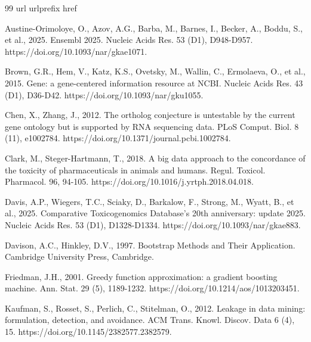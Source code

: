 \documentclass[review,12pt,authoryear]{elsarticle}
\begin{document}
\begin{thebibliography}{99}
\expandafter\ifx\csname url\endcsname\relax
  \def\url#1{\texttt{#1}}\fi
\expandafter\ifx\csname urlprefix\endcsname\relax\def\urlprefix{URL }\fi
\expandafter\ifx\csname href\endcsname\relax
  \def\href#1#2{#2} \def\path#1{#1}\fi

Austine-Orimoloye, O., Azov, A.G., Barba, M., Barnes, I., Becker, A., Boddu, S.,
et al., 2025. Ensembl 2025. Nucleic Acids Res. 53 (D1), D948-D957.
https://doi.org/10.1093/nar/gkae1071.

Brown, G.R., Hem, V., Katz, K.S., Ovetsky, M., Wallin, C., Ermolaeva, O., et
al., 2015. Gene: a gene-centered information resource at NCBI. Nucleic Acids Res.
43 (D1), D36-D42. https://doi.org/10.1093/nar/gku1055.

Chen, X., Zhang, J., 2012. The ortholog conjecture is untestable by the current
gene ontology but is supported by RNA sequencing data. PLoS Comput. Biol. 8 (11),
e1002784. https://doi.org/10.1371/journal.pcbi.1002784.

Clark, M., Steger-Hartmann, T., 2018. A big data approach to the concordance of
the toxicity of pharmaceuticals in animals and humans. Regul. Toxicol.
Pharmacol. 96, 94-105. https://doi.org/10.1016/j.yrtph.2018.04.018.

Davis, A.P., Wiegers, T.C., Sciaky, D., Barkalow, F., Strong, M., Wyatt, B., et
al., 2025. Comparative Toxicogenomics Database's 20th anniversary: update 2025.
Nucleic Acids Res. 53 (D1), D1328-D1334. https://doi.org/10.1093/nar/gkae883.

Davison, A.C., Hinkley, D.V., 1997. Bootstrap Methods and Their Application.
Cambridge University Press, Cambridge.

Friedman, J.H., 2001. Greedy function approximation: a gradient boosting machine.
Ann. Stat. 29 (5), 1189-1232. https://doi.org/10.1214/aos/1013203451.

Kaufman, S., Rosset, S., Perlich, C., Stitelman, O., 2012. Leakage in data
mining: formulation, detection, and avoidance. ACM Trans. Knowl. Discov. Data 6
(4), 15. https://doi.org/10.1145/2382577.2382579.


\end{thebibliography}
\end{document}
